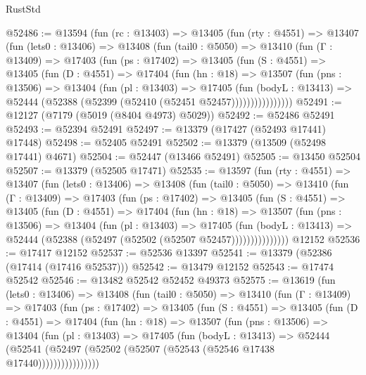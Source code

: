 \begin{lexlean}{RustStd}
\begin{coremodule}
@52486 := @13594
    (fun (rc : @13403) =>
    @13405
      (fun (rty : @4551) =>
      @13407
        (fun (lets0 : @13406) =>
        @13408
          (fun (tail0 : @5050) =>
          @13410
            (fun (Γ : @13409) =>
            @17403
              (fun (ps : @17402) =>
              @13405
                (fun (S : @4551) =>
                @13405
                  (fun (D : @4551) =>
                  @17404
                    (fun (hn : @18) =>
                    @13507
                      (fun (pns : @13506) =>
                      @13404
                        (fun (pl : @13403) =>
                        @17405
                          (fun (bodyL : @13413) =>
                          @52444 (@52388 (@52399 (@52410 (@52451 @52457))))))))))))))))
@52491 := @12127 (@7179 (@5019 (@8404 @4973) @5029))
@52492 := @52486 @52491
@52493 := @52394 @52491
@52497 := @13379 (@17427 (@52493 @17441) @17448)
@52498 := @52405 @52491
@52502 := @13379 (@13509 (@52498 @17441) @4671)
@52504 := @52447 (@13466 @52491)
@52505 := @13450 @52504
@52507 := @13379 (@52505 @17471)
@52535 := @13597
    (fun (rty : @4551) =>
    @13407
      (fun (lets0 : @13406) =>
      @13408
        (fun (tail0 : @5050) =>
        @13410
          (fun (Γ : @13409) =>
          @17403
            (fun (ps : @17402) =>
            @13405
              (fun (S : @4551) =>
              @13405
                (fun (D : @4551) =>
                @17404
                  (fun (hn : @18) =>
                  @13507
                    (fun (pns : @13506) =>
                    @13404
                      (fun (pl : @13403) =>
                      @17405
                        (fun (bodyL : @13413) =>
                        @52444 (@52388 (@52497 (@52502 (@52507 @52457)))))))))))))))
    @12152
@52536 := @17417 @12152
@52537 := @52536 @13397
@52541 := @13379 (@52386 (@17414 (@17416 @52537)))
@52542 := @13479 @12152
@52543 := @17474 @52542
@52546 := @13482 @52542 @52452 @49373
@52575 := @13619
    (fun (lets0 : @13406) =>
    @13408
      (fun (tail0 : @5050) =>
      @13410
        (fun (Γ : @13409) =>
        @17403
          (fun (ps : @17402) =>
          @13405
            (fun (S : @4551) =>
            @13405
              (fun (D : @4551) =>
              @17404
                (fun (hn : @18) =>
                @13507
                  (fun (pns : @13506) =>
                  @13404
                    (fun (pl : @13403) =>
                    @17405
                      (fun (bodyL : @13413) =>
                      @52444
                        (@52541
                          (@52497 (@52502 (@52507 (@52543 (@52546 @17438 @17440))))))))))))))))

\end{coremodule}
\end{lexlean}

